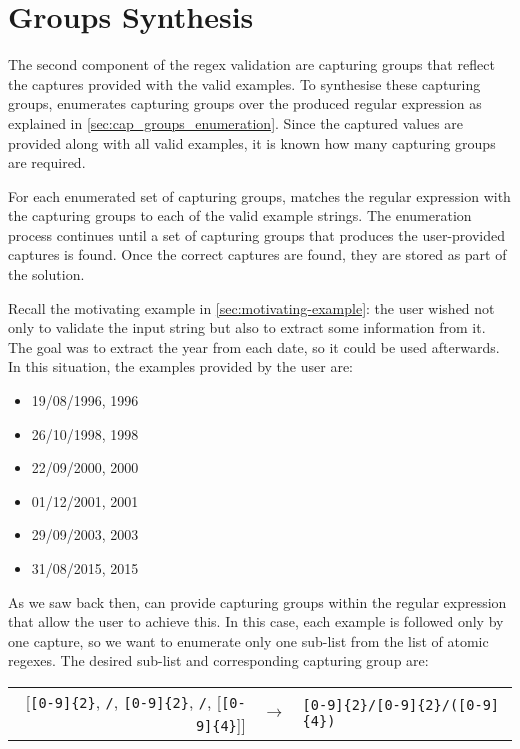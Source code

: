 \section{Groups Synthesis}\label{sec:cap_groups_synthesis}
The second component of the regex validation are capturing groups that reflect the captures provided with the valid examples. To synthesise these capturing groups, \Forest enumerates capturing groups over the produced regular expression as explained in \autoref{sec:cap_groups_enumeration}. Since the captured values are provided along with all valid examples, it is known how many capturing groups are required.

For each enumerated set of capturing groups, \Forest matches the regular expression with the capturing groups to each of the valid example strings. The enumeration process continues until a set of capturing groups that produces the user-provided captures is found. Once the correct captures are found, they are stored as part of the solution.

\begin{example}
Recall the motivating example in \autoref{sec:motivating-example}: the user wished not only to validate the input string but also to extract some information from it. The goal was to extract the year from each date, so it could be used afterwards. In this situation, the examples provided by the user are:
%
\begin{multicols}{3}
    \begin{itemize}[label={}]
    \item 19/08/1996, 1996
    \item 26/10/1998, 1998
    \item 22/09/2000, 2000
    \item 01/12/2001, 2001
    \item 29/09/2003, 2003
    \item 31/08/2015, 2015
    \end{itemize}
\end{multicols}
%
As we saw back then, \Forest can provide capturing groups within the regular expression that allow the user to achieve this. In this case, each example is followed only by one capture, so we want to enumerate only one sub-list from the list of atomic regexes. The desired sub-list and corresponding capturing group are:
%
\begin{center}
\begin{tabular}{rcl}
[\verb![0-9]{2}!, \verb!/!, \verb![0-9]{2}!, \verb!/!, [\verb![0-9]{4}!]] & $\rightarrow$ & \verb![0-9]{2}/[0-9]{2}/([0-9]{4})!
\end{tabular}\bigskip
\end{center}
\end{example}


